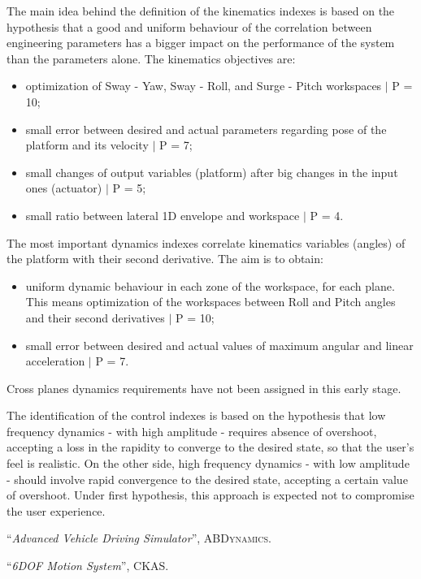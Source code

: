 \documentclass[10.5pt, twocolumn]{article}
\newcommand{\Virgolette}[1]{``#1''}
\begin{document}
The main idea behind the definition of the kinematics indexes is based on the hypothesis that a good and uniform behaviour of the correlation between engineering parameters has a bigger impact on the performance of the system than the parameters alone.
The kinematics objectives are:
\begin{itemize}
	\item optimization of Sway - Yaw, Sway - Roll, and Surge - Pitch workspaces $\mid$ P = 10;
	\item small error between desired and actual parameters regarding pose of the platform and its velocity $\mid$ P = 7;
	\item small changes of output variables (platform) after big changes in the input ones (actuator) $\mid$ P = 5;
	\item small ratio between lateral 1D envelope and workspace $\mid$ P = 4.
\end{itemize}

The most important dynamics indexes correlate kinematics variables (angles) of the platform with their second derivative.
The aim is to obtain:
\begin{itemize}
	\item uniform dynamic behaviour in each zone of the workspace, for each plane. This means optimization of the workspaces between Roll and Pitch angles and their second derivatives $\mid$ P = 10;
	\item small error between desired and actual values of maximum angular and linear acceleration $\mid$ P = 7.
\end{itemize}
Cross planes dynamics requirements have not been assigned in this early stage.

The identification of the control indexes is based on the hypothesis that low frequency dynamics - with high amplitude - requires absence of overshoot, accepting a loss in the rapidity to converge to the desired state, so that the user's feel is realistic.
On the other side, high frequency dynamics - with low amplitude - should involve rapid convergence to the desired state, accepting a certain value of overshoot.
Under first hypothesis, this approach is expected not to compromise the user experience.


\begin{thebibliography}{}
\Virgolette{\textit{Advanced Vehicle Driving Simulator}}, \textsc{ABDynamics}.

\Virgolette{\textit{6DOF Motion System}}, \textsc{CKAS}.

\end{thebibliography}
\end{document}
